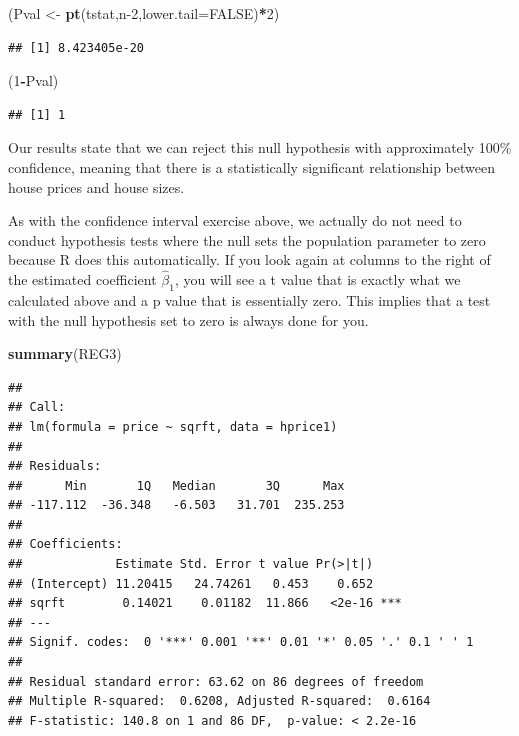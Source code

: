 \documentclass[
]{book}
\newenvironment{Shaded}{\begin{snugshade}}{\end{snugshade}}
\newcommand{\AttributeTok}[1]{\textcolor[rgb]{0.13,0.29,0.53}{#1}}
\newcommand{\ConstantTok}[1]{\textcolor[rgb]{0.56,0.35,0.01}{#1}}
\newcommand{\DecValTok}[1]{\textcolor[rgb]{0.00,0.00,0.81}{#1}}
\newcommand{\FunctionTok}[1]{\textcolor[rgb]{0.13,0.29,0.53}{\textbf{#1}}}
\newcommand{\NormalTok}[1]{#1}
\newcommand{\OtherTok}[1]{\textcolor[rgb]{0.56,0.35,0.01}{#1}}
\newcommand{\SpecialCharTok}[1]{\textcolor[rgb]{0.81,0.36,0.00}{\textbf{#1}}}
\begin{document}
\begin{Shaded}
\begin{Highlighting}[]
\NormalTok{(Pval }\OtherTok{\textless{}{-}} \FunctionTok{pt}\NormalTok{(tstat,n}\DecValTok{{-}2}\NormalTok{,}\AttributeTok{lower.tail=}\ConstantTok{FALSE}\NormalTok{)}\SpecialCharTok{*}\DecValTok{2}\NormalTok{)}
\end{Highlighting}
\end{Shaded}

\begin{verbatim}
## [1] 8.423405e-20
\end{verbatim}

\begin{Shaded}
\begin{Highlighting}[]
\NormalTok{(}\DecValTok{1}\SpecialCharTok{{-}}\NormalTok{Pval)}
\end{Highlighting}
\end{Shaded}

\begin{verbatim}
## [1] 1
\end{verbatim}

Our results state that we can reject this null hypothesis with approximately 100\% confidence, meaning that there is a statistically significant relationship between house prices and house sizes.

As with the confidence interval exercise above, we actually do not need to conduct hypothesis tests where the null sets the population parameter to zero because R does this automatically. If you look again at columns to the right of the estimated coefficient \(\hat{\beta}_1\), you will see a t value that is exactly what we calculated above and a p value that is essentially zero. This implies that a test with the null hypothesis set to zero is always done for you.

\begin{Shaded}
\begin{Highlighting}[]
\FunctionTok{summary}\NormalTok{(REG3)}
\end{Highlighting}
\end{Shaded}

\begin{verbatim}
## 
## Call:
## lm(formula = price ~ sqrft, data = hprice1)
## 
## Residuals:
##      Min       1Q   Median       3Q      Max 
## -117.112  -36.348   -6.503   31.701  235.253 
## 
## Coefficients:
##             Estimate Std. Error t value Pr(>|t|)    
## (Intercept) 11.20415   24.74261   0.453    0.652    
## sqrft        0.14021    0.01182  11.866   <2e-16 ***
## ---
## Signif. codes:  0 '***' 0.001 '**' 0.01 '*' 0.05 '.' 0.1 ' ' 1
## 
## Residual standard error: 63.62 on 86 degrees of freedom
## Multiple R-squared:  0.6208, Adjusted R-squared:  0.6164 
## F-statistic: 140.8 on 1 and 86 DF,  p-value: < 2.2e-16
\end{verbatim}
\end{document}
